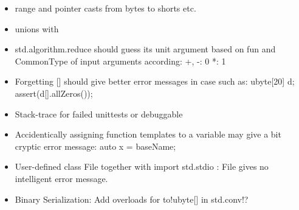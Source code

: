\documentclass[xcolor=dvipsnames, twocolumn]{article}
\begin{document}
\begin{itemize}
\item range and pointer casts from bytes to shorts etc.
\item unions with

\item std.algorithm.reduce should guess its unit argument based on fun and
  CommonType of input arguments according:
 +, -: 0
 *: 1

\item Forgetting [] should give better error messages in case such as:
  ubyte[20] d; assert(d[].allZeros());

\item Stack-trace for failed unittests or debuggable

\item Accidentically assigning function templates to a variable may give a bit
  cryptic error message: auto x = baseName;

\item User-defined class File together with import std.stdio : File gives no
  intelligent error message.

\item Binary Serialization: Add overloads for to!ubyte[] in std.conv!?


\end{itemize}
\end{document}

